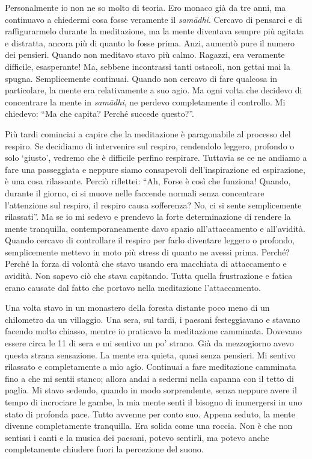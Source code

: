 Personalmente io non ne so molto di
teoria. Ero monaco già da tre anni, ma continuavo a chiedermi cosa fosse
veramente il \emph{samādhi}. Cercavo di pensarci e di raffigurarmelo durante la
meditazione, ma la mente diventava sempre più agitata e distratta,
ancora più di quanto lo fosse prima. Anzi, aumentò pure il numero dei
pensieri. Quando non meditavo stavo più calmo. Ragazzi, era veramente
difficile, esasperante! Ma, sebbene incontrassi tanti ostacoli, non
gettai mai la spugna. Semplicemente continuai. Quando non cercavo di
fare qualcosa in particolare, la mente era relativamente a suo agio. Ma
ogni volta che decidevo di concentrare la mente in \emph{samādhi}, ne perdevo
completamente il controllo. Mi chiedevo: ``Ma che capita? Perché succede
questo?''.

Più tardi cominciai a capire che la meditazione è paragonabile al
processo del respiro. Se decidiamo di intervenire sul respiro,
rendendolo leggero, profondo o solo `giusto', vedremo che è difficile
perfino respirare. Tuttavia se ce ne andiamo a fare una passeggiata e
neppure siamo consapevoli dell'inspirazione ed espirazione, è una cosa
rilassante. Perciò riflettei: ``Ah, Forse è così che funziona! Quando,
durante il giorno, ci si muove nelle faccende normali senza concentrare
l'attenzione sul respiro, il respiro causa sofferenza? No, ci si sente
semplicemente rilassati''. Ma se io mi sedevo e prendevo la forte
determinazione di rendere la mente tranquilla, contemporaneamente davo
spazio all'attaccamento e all'avidità. Quando cercavo di controllare il
respiro per farlo diventare leggero o profondo, semplicemente mettevo in
moto più stress di quanto ne avessi prima. Perché? Perché la forza di
volontà che stavo usando era macchiata di attaccamento e avidità. Non
sapevo ciò che stava capitando. Tutta quella frustrazione e fatica erano
causate dal fatto che portavo nella meditazione l'attaccamento.


Una volta stavo in un monastero della foresta distante poco meno di un
chilometro da un villaggio. Una sera, sul tardi, i paesani festeggiavano
e stavano facendo molto chiasso, mentre io praticavo la meditazione
camminata. Dovevano essere circa le 11 di sera e mi sentivo un po'
strano. Già da mezzogiorno avevo questa strana sensazione. La mente era
quieta, quasi senza pensieri. Mi sentivo rilassato e completamente a mio
agio. Continuai a fare meditazione camminata fino a che mi sentii
stanco; allora andai a sedermi nella capanna con il tetto di paglia. Mi
stavo sedendo, quando in modo sorprendente, senza neppure avere il tempo
di incrociare le gambe, la mia mente sentì il bisogno di immergersi in
uno stato di profonda pace. Tutto avvenne per conto suo. Appena seduto,
la mente divenne completamente tranquilla. Era solida come una roccia.
Non è che non sentissi i canti e la musica dei paesani, potevo sentirli,
ma potevo anche completamente chiudere fuori la percezione del suono.

